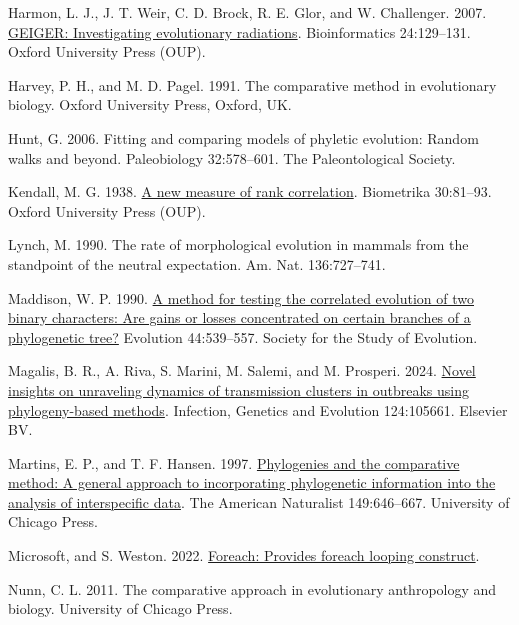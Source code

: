 \documentclass[fleqn,10pt,lineno]{wlpeerj} %
\newlength{\cslhangindent}
\newenvironment{CSLReferences}[2] %
 {\begin{list}{}{%
  \setlength{\itemindent}{0pt}
  \setlength{\leftmargin}{0pt}
  \setlength{\parsep}{0pt}
  \ifodd #1
   \setlength{\leftmargin}{\cslhangindent}
   \setlength{\itemindent}{-1\cslhangindent}
  \fi
  \setlength{\itemsep}{#2\baselineskip}}}
 {\end{list}}
\begin{document}
\begin{CSLReferences}{1}{0}
Harmon, L. J., J. T. Weir, C. D. Brock, R. E. Glor, and W. Challenger. 2007. \href{https://doi.org/10.1093/bioinformatics/btm538}{GEIGER: Investigating evolutionary radiations}. Bioinformatics 24:129--131. Oxford University Press (OUP).

Harvey, P. H., and M. D. Pagel. 1991. The comparative method in evolutionary biology. Oxford University Press, Oxford, UK.

Hunt, G. 2006. Fitting and comparing models of phyletic evolution: Random walks and beyond. Paleobiology 32:578--601. The Paleontological Society.

Kendall, M. G. 1938. \href{https://doi.org/10.1093/biomet/30.1-2.81}{A new measure of rank correlation}. Biometrika 30:81--93. Oxford University Press (OUP).

Lynch, M. 1990. The rate of morphological evolution in mammals from the standpoint of the neutral expectation. Am. Nat. 136:727--741.

Maddison, W. P. 1990. \href{https://doi.org/10.2307/2409435}{A method for testing the correlated evolution of two binary characters: Are gains or losses concentrated on certain branches of a phylogenetic tree?} Evolution 44:539--557. Society for the Study of Evolution.

Magalis, B. R., A. Riva, S. Marini, M. Salemi, and M. Prosperi. 2024. \href{https://doi.org/10.1016/j.meegid.2024.105661}{Novel insights on unraveling dynamics of transmission clusters in outbreaks using phylogeny-based methods}. Infection, Genetics and Evolution 124:105661. Elsevier BV.

Martins, E. P., and T. F. Hansen. 1997. \href{https://doi.org/10.1086/286013}{Phylogenies and the comparative method: A general approach to incorporating phylogenetic information into the analysis of interspecific data}. The American Naturalist 149:646--667. University of Chicago Press.

Microsoft, and S. Weston. 2022. \href{https://CRAN.R-project.org/package=foreach}{Foreach: Provides foreach looping construct}.

Nunn, C. L. 2011. The comparative approach in evolutionary anthropology and biology. University of Chicago Press.


\end{CSLReferences}
\end{document}
